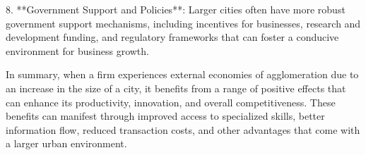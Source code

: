 8. **Government Support and Policies**: Larger cities often have more robust government support mechanisms, including incentives for businesses, research and development funding, and regulatory frameworks that can foster a conducive environment for business growth.

In summary, when a firm experiences external economies of agglomeration due to an increase in the size of a city, it benefits from a range of positive effects that can enhance its productivity, innovation, and overall competitiveness. These benefits can manifest through improved access to specialized skills, better information flow, reduced transaction costs, and other advantages that come with a larger urban environment.
